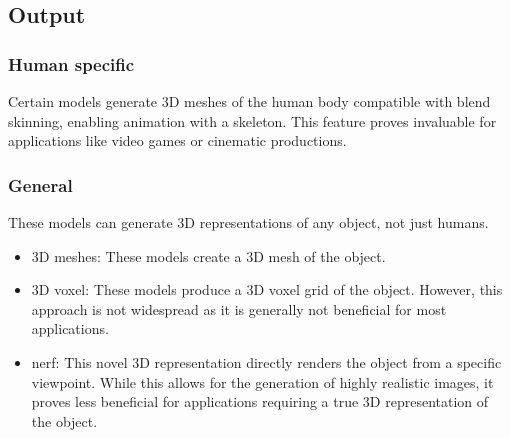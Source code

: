 \subsection{Output}

\subsubsection{Human specific}

Certain models generate 3D meshes of the human body compatible with blend
skinning, enabling animation with a skeleton. This feature proves invaluable
for applications like video games or cinematic productions.

\subsubsection{General}

These models can generate 3D representations of any object, not just humans.

\begin{itemize}
    \item 3D meshes: These models create a 3D mesh of the object.
    \item 3D voxel: These models produce a 3D voxel grid of the object. However, this approach is not widespread as it is generally not beneficial for most applications.
    \item \gls{nerf}: This novel 3D representation directly renders the object from a specific viewpoint. While this allows for the generation of highly realistic images, it proves less beneficial for applications requiring a true 3D representation of the object.
\end{itemize}

